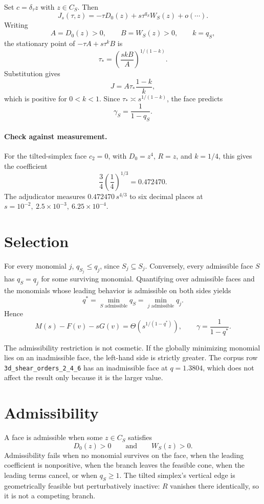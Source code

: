 \documentclass[11pt]{article}
\theoremstyle{definition}
\theoremstyle{remark}
\begin{document}
Set $c=\delta_\tau z$ with $z\in C_S$.  Then
\[
  J_s(\tau,z)
  =-\tau D_0(z)+s\tau^{q_S}W_S(z)+o(\cdots).
\]
Writing
\[
  A=D_0(z)>0,
  \qquad B=W_S(z)>0,
  \qquad k=q_S,
\]
the stationary point of $-\tau A+s\tau^kB$ is
\[
  \tau_*
  =\left(\frac{skB}{A}\right)^{1/(1-k)}.
\]
Substitution gives
\[
  J=A\tau_*\frac{1-k}{k},
\]
which is positive for $0<k<1$.  Since
$\tau_*\asymp s^{1/(1-k)}$, the face predicts
\[
  \gamma_S=\frac{1}{1-q_S}.
\]

\paragraph{Check against measurement.}
For the tilted-simplex face $c_2=0$, with
$D_0=z^4$, $R=z$, and $k=1/4$, this gives the coefficient
\[
  \frac34\left(\frac14\right)^{1/3}=0.472470.
\]
The adjudicator measures $0.472470\,s^{4/3}$ to six decimal places at
$s=10^{-2},\ 2.5\times10^{-3},\ 6.25\times10^{-4}$.

\section{Selection}

For every monomial $j$, $q_{S_j}\leq q_j$, since $S_j\subseteq S_j$.
Conversely, every admissible face $S$ has $q_S=q_j$ for some surviving
monomial.  Quantifying over admissible faces and the monomials whose leading
behavior is admissible on both sides yields
\[
  q^*
  =\min_{S\text{ admissible}}q_S
  =\min_{j\text{ admissible}}q_j.
\]
Hence
\[
  M(s)-F(v)-sG(v)
  =\Theta\!\left(s^{1/(1-q^*)}\right),
  \qquad
  \boxed{\gamma=\frac{1}{1-q^*}}.
\]

The admissibility restriction is not cosmetic.  If the globally minimizing
monomial lies on an inadmissible face, the left-hand side is strictly greater.
The corpus row \texttt{3d\_shear\_orders\_2\_4\_6} has an inadmissible face at
$q=1.3804$, which does not affect the result only because it is the larger
value.

\section{Admissibility}

A face is admissible when some $z\in C_S$ satisfies
\[
  D_0(z)>0
  \qquad\text{and}\qquad
  W_S(z)>0.
\]
Admissibility fails when no monomial survives on the face, when the leading
coefficient is nonpositive, when the branch leaves the feasible cone, when the
leading terms cancel, or when $q_S\geq1$.  The tilted simplex's vertical edge
is geometrically feasible but perturbatively inactive: $R$ vanishes there
identically, so it is not a competing branch.
\end{document}
